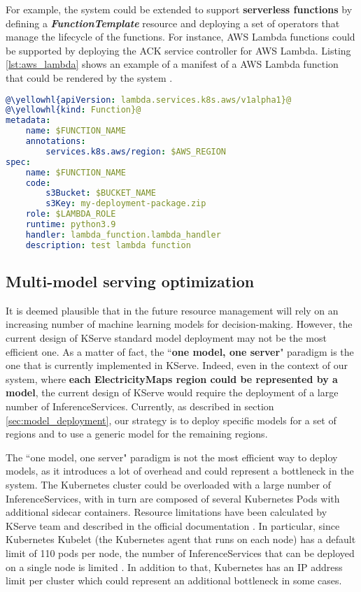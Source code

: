 For example, the system could be extended to support \textbf{serverless functions} by defining a \textbf{\textit{FunctionTemplate}} resource and deploying a set of operators that manage the lifecycle of the functions.
For instance, AWS Lambda functions could be supported by deploying the ACK service controller for AWS Lambda.
Listing \ref{lst:aws_lambda} shows an example of a manifest of a AWS Lambda function that could be rendered by the system \cite{aws_lambda_ack}. \newline

\begin{lstlisting}[language=yaml, caption=AWS Lambda manifest example \cite{aws_lambda_ack}, label=lst:aws_lambda]
@\yellowhl{apiVersion: lambda.services.k8s.aws/v1alpha1}@
@\yellowhl{kind: Function}@
metadata:
    name: $FUNCTION_NAME
    annotations:
        services.k8s.aws/region: $AWS_REGION
spec:
    name: $FUNCTION_NAME
    code:
        s3Bucket: $BUCKET_NAME
        s3Key: my-deployment-package.zip
    role: $LAMBDA_ROLE
    runtime: python3.9
    handler: lambda_function.lambda_handler
    description: test lambda function
\end{lstlisting}

\subsection{Multi-model serving optimization}

It is deemed plausible that in the future resource management will rely on an increasing number of machine learning models for decision-making.
However, the current design of KServe standard model deployment may not be the most efficient one.
As a matter of fact, the ``\textbf{one model, one server}" paradigm is the one that is currently implemented in KServe.
Indeed, even in the context of our system, where \textbf{each ElectricityMaps region could be represented by a model}, the current design of KServe would require the deployment of a large number of InferenceServices.
Currently, as described in section \ref{sec:model_deployment}, our strategy is to deploy specific models for a set of regions and to use a generic model for the remaining regions.

The ``one model, one server" paradigm is not the most efficient way to deploy models, as it introduces a lot of overhead and could represent a bottleneck in the system.
The Kubernetes cluster could be overloaded with a large number of InferenceServices, with in turn are composed of several Kubernetes Pods with additional sidecar containers.
Resource limitations have been calculated by KServe team and described in the official documentation \cite{kserve_multi_model}.
In particular, since Kubernetes Kubelet (the Kubernetes agent that runs on each node) has a default limit of 110 pods per node, the number of InferenceServices that can be deployed on a single node is limited \cite{kserve_multi_model}.
In addition to that, Kubernetes has an IP address limit per cluster which could represent an additional bottleneck in some cases.

